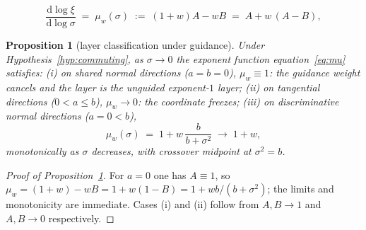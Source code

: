 \documentclass[10pt,a4paper]{amsart}
\newcommand{\ProofGLayers}{%
For $a=0$ one has $A \equiv 1$, so $\mu_w = (1+w) - wB = 1 +
w(1-B) = 1 + wb/(b+\sigma^2)$; the limits and monotonicity are immediate.
Cases (i) and (ii) follow from $A, B \to 1$ and $A, B \to 0$ respectively.
}
\newtheorem{proposition}{Proposition}
\providecommand{\dd}{\mathrm{d}}
\def\eqref#1{equation~\ref{#1}}
\begin{document}
\begin{equation}\label{eq:mu}
  \frac{\dd \log \xi}{\dd \log \sigma}
  \;=\; \mu_w(\sigma)
  \;:=\; (1+w)A - wB
  \;=\; A + w\,(A - B),
\end{equation}

\begin{proposition}[layer classification under guidance]\label{prop:glayers}
Under Hypothesis~\ref{hyp:commuting}, as $\sigma \to 0$ the exponent
function \eqref{eq:mu} satisfies:
(i) on shared normal directions ($a = b = 0$), $\mu_w \equiv 1$: the
guidance weight cancels and the layer is the unguided exponent-$1$
layer;
(ii) on tangential directions ($0 < a \le b$), $\mu_w \to 0$: the
coordinate freezes;
(iii) on \emph{discriminative normal} directions ($a = 0 < b$),
\begin{equation}\label{eq:crossover}
  \mu_w(\sigma) \;=\; 1 + w\,\frac{b}{b+\sigma^2}
  \;\longrightarrow\; 1+w ,
\end{equation}
monotonically as $\sigma$ decreases, with crossover midpoint at
$\sigma^2 = b$.
\end{proposition}

\begin{proof}[Proof of Proposition~\ref{prop:glayers}]
\ProofGLayers
\end{proof}
\end{document}
